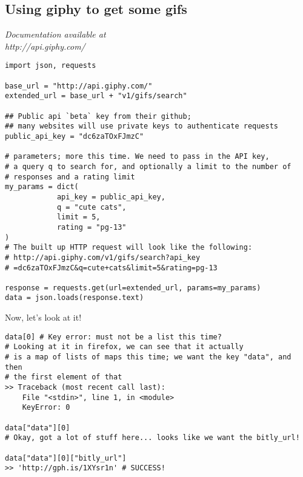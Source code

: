 \documentclass{article}
\begin{document}
\pagebreak

\subsection{Using giphy to get some gifs}
\textit{Documentation available at\\http://api.giphy.com/}

\begin{verbatim}
import json, requests

base_url = "http://api.giphy.com/"
extended_url = base_url + "v1/gifs/search"

## Public api `beta` key from their github;
## many websites will use private keys to authenticate requests
public_api_key = "dc6zaTOxFJmzC"

# parameters; more this time. We need to pass in the API key,
# a query q to search for, and optionally a limit to the number of
# responses and a rating limit
my_params = dict(
            api_key = public_api_key,
            q = "cute cats",
            limit = 5,
            rating = "pg-13"
)
# The built up HTTP request will look like the following:
# http://api.giphy.com/v1/gifs/search?api_key
# =dc6zaTOxFJmzC&q=cute+cats&limit=5&rating=pg-13

response = requests.get(url=extended_url, params=my_params)
data = json.loads(response.text)
\end{verbatim}
Now, let's look at it!


\begin{verbatim}
data[0] # Key error: must not be a list this time?
# Looking at it in firefox, we can see that it actually
# is a map of lists of maps this time; we want the key "data", and then
# the first element of that
>> Traceback (most recent call last):
    File "<stdin>", line 1, in <module>
    KeyError: 0
  
data["data"][0]
# Okay, got a lot of stuff here... looks like we want the bitly_url!

data["data"][0]["bitly_url"]
>> 'http://gph.is/1XYsr1n' # SUCCESS!
\end{verbatim}
\end{document}
